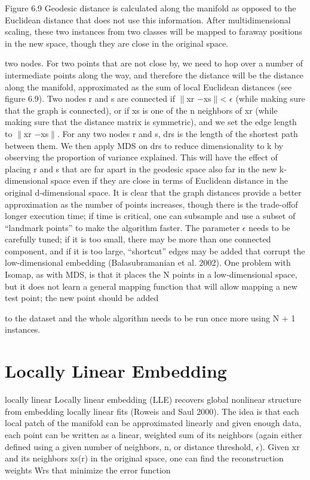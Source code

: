 Figure 6.9 Geodesic distance is calculated along the manifold as opposed to the Euclidean distance that does not use this information. After multidimensional scaling, these two instances from two classes will be mapped to faraway positions in the new space, though they are close in the original space.

two nodes. For two points that are not close by, we need to hop over a number of intermediate points along the way, and therefore the distance will be the distance along the manifold, approximated as the sum of local Euclidean distances (see figure 6.9). Two nodes r and s are connected if $\parallel$xr $-$xs$\parallel$< $\epsilon$ (while making sure that the graph is connected), or if xs is one of the n neighbors of xr (while making sure that the distance matrix is symmetric), and we set the edge length to $\parallel$xr $-$xs$\parallel$. For any two nodes r and s, drs is the length of the shortest path between them. We then apply MDS on drs to reduce dimensionality to k by observing the proportion of variance explained. This will have the effect of placing r and s that are far apart in the geodesic space also far in the new k-dimensional space even if they are close in terms of Euclidean distance in the original d-dimensional space. It is clear that the graph distances provide a better approximation as the number of points increases, though there is the trade-offof longer execution time; if time is critical, one can subsample and use a subset of “landmark points” to make the algorithm faster. The parameter $\epsilon$ needs to be carefully tuned; if it is too small, there may be more than one connected component, and if it is too large, “shortcut” edges may be added that corrupt the low-dimensional embedding (Balasubramanian et al. 2002). One problem with Isomap, as with MDS, is that it places the N points in a low-dimensional space, but it does not learn a general mapping function that will allow mapping a new test point; the new point should be added

to the dataset and the whole algorithm needs to be run once more using N + 1 instances.

\section{Locally Linear Embedding}

locally linear Locally linear embedding (LLE) recovers global nonlinear structure from embedding locally linear fits (Roweis and Saul 2000). The idea is that each local patch of the manifold can be approximated linearly and given enough data, each point can be written as a linear, weighted sum of its neighbors (again either defined using a given number of neighbors, n, or distance threshold, $\epsilon$). Given xr and its neighbors xs(r) in the original space, one can find the reconstruction weights Wrs that minimize the error function

